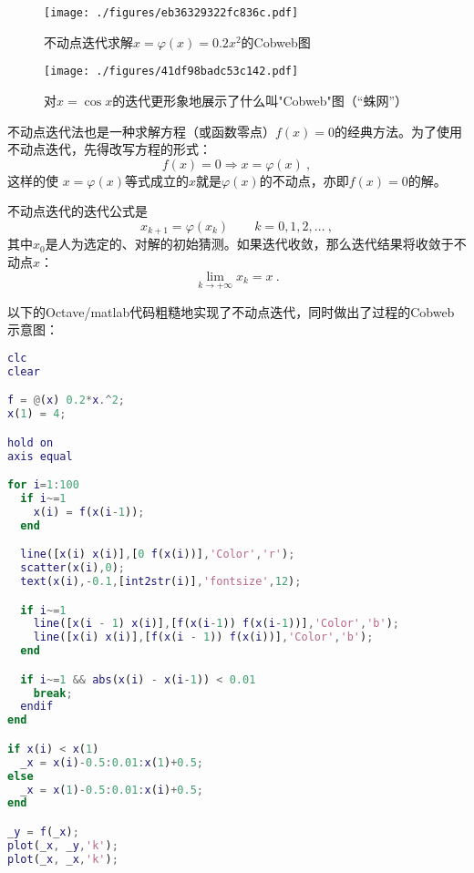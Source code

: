 
\begin{figure}[ht]
\centering
\texttt{[image: ./figures/eb36329322fc836c.pdf]}
\caption{不动点迭代求解$x=\varphi(x)=0.2x^2$的Cobweb图} \label{fig_FPIPLT_1}
\end{figure}

\begin{figure}[ht]
\centering
\texttt{[image: ./figures/41df98badc53c142.pdf]}
\caption{对$x=\cos x$的迭代更形象地展示了什么叫"Cobweb"图（“蛛网”）} \label{fig_FPIPLT_2}
\end{figure}

不动点迭代法也是一种求解方程（或函数零点）$f(x)=0$的经典方法。为了使用不动点迭代，先得改写方程的形式：
\begin{equation}
f(x)=0\Rightarrow x = \varphi(x)~,
\end{equation}
这样的使 $x = \varphi(x)$等式成立的$x$就是$\varphi(x)$的不动点，亦即$f(x)=0$的解。

不动点迭代的迭代公式是
\begin{equation}
x_{k+1} = \varphi(x_k) \qquad k=0,1,2,...~,
\end{equation}
其中$x_0$是人为选定的、对解的初始猜测。如果迭代收敛，那么迭代结果将收敛于不动点$x$：
$$\lim_{k\to+\infty} x_k = x~.$$

以下的Octave/matlab代码粗糙地实现了不动点迭代，同时做出了过程的Cobweb示意图：

\begin{lstlisting}[language=matlab]
clc
clear

f = @(x) 0.2*x.^2;
x(1) = 4;

hold on
axis equal

for i=1:100
  if i~=1
    x(i) = f(x(i-1));
  end

  line([x(i) x(i)],[0 f(x(i))],'Color','r');
  scatter(x(i),0);
  text(x(i),-0.1,[int2str(i)],'fontsize',12);

  if i~=1
    line([x(i - 1) x(i)],[f(x(i-1)) f(x(i-1))],'Color','b');
    line([x(i) x(i)],[f(x(i - 1)) f(x(i))],'Color','b');
  end

  if i~=1 && abs(x(i) - x(i-1)) < 0.01
    break;
  endif
end

if x(i) < x(1)
  _x = x(i)-0.5:0.01:x(1)+0.5;
else
  _x = x(1)-0.5:0.01:x(i)+0.5;
end

_y = f(_x);
plot(_x, _y,'k');
plot(_x, _x,'k');
\end{lstlisting}
